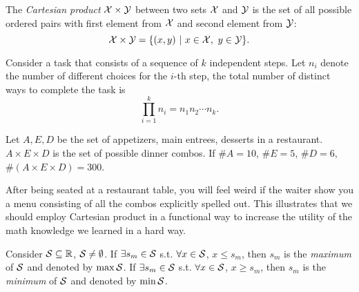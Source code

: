 \begin{defn}
  \label{def:CartesianProduct}
  The \emph{Cartesian product} ${\cal X}\times {\cal Y}$
   between two sets ${\cal X}$ and ${\cal Y}$
   is the set of all possible ordered pairs with first element
   from ${\cal X}$ and second element from ${\cal Y}$:
   \begin{equation}
     {\cal X}\times {\cal Y} = \{(x,y)\ |\ x\in {\cal X},\ y\in {\cal Y}\}.
   \end{equation}
\end{defn}

\begin{axm}
  \label{axm:multiplicationPrinciple}
  Consider a task that consists of a sequence of $k$ independent steps.
  Let $n_i$ denote the number of different choices for the $i$-th step,
   the total number of distinct ways to complete the task
   is 
   \begin{equation}
     \prod_{i=1}^{k} n_i = n_1n_2\cdots n_k.
   \end{equation}
 \end{axm}

 \begin{exm}
   \label{exm:dinnerCombos}
   Let $A, E, D$ be the set of appetizers,
    main entrees, desserts in a restaurant.
   $A\times E\times D$
    is the set of possible dinner combos.
   If $\#A=10$, $\#E=5$, $\#D=6$,
    $\#(A\times E\times D)=300$.
 \end{exm}

 \begin{rem}
   After being seated at a restaurant table,
   you will feel weird if the waiter
   show you a menu consisting of all the combos
   explicitly spelled out.
   This illustrates that we should employ Cartesian product
    in a functional way to increase the utility
    of the math knowledge we learned in a hard way.
 \end{rem}
 
\begin{defn}
  Consider ${\cal S}\subseteq \mathbb{R}$,
   ${\cal S}\ne \emptyset$.
  If $\exists s_m\in{\cal S}$
   s.t. $\forall x\in {\cal S}$, $x\le s_m$,
   then $s_m$ is the \emph{maximum} of ${\cal S}$
   and denoted by $\max {\cal S}$.
  If $\exists s_m\in{\cal S}$
   s.t. $\forall x\in {\cal S}$, $x\ge s_m$,
   then $s_m$ is the \emph{minimum} of ${\cal S}$
   and denoted by $\min {\cal S}$.
\end{defn}

